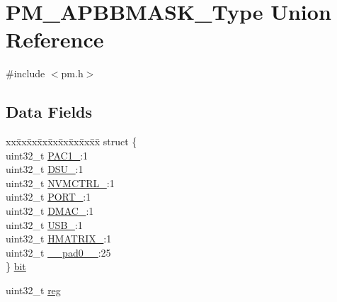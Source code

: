 \hypertarget{union_p_m___a_p_b_b_m_a_s_k___type}{}\section{P\+M\+\_\+\+A\+P\+B\+B\+M\+A\+S\+K\+\_\+\+Type Union Reference}
\label{union_p_m___a_p_b_b_m_a_s_k___type}


{\ttfamily \#include $<$pm.\+h$>$}

\subsection*{Data Fields}
\begin{DoxyCompactItemize}
\item 
\begin{tabbing}
xx\=xx\=xx\=xx\=xx\=xx\=xx\=xx\=xx\=\kill
struct \{\\
\>uint32\_t \mbox{\hyperlink{union_p_m___a_p_b_b_m_a_s_k___type_aa6054dab2ee60dc79fd6c2939cc2aed4}{PAC1\_}}:1\\
\>uint32\_t \mbox{\hyperlink{union_p_m___a_p_b_b_m_a_s_k___type_a724689d6c4fa35b29f257a0c6f3ceb80}{DSU\_}}:1\\
\>uint32\_t \mbox{\hyperlink{union_p_m___a_p_b_b_m_a_s_k___type_a6de823b7e07b83ea17b7629575f4173f}{NVMCTRL\_}}:1\\
\>uint32\_t \mbox{\hyperlink{union_p_m___a_p_b_b_m_a_s_k___type_ac43e1bcb4bcc76d98a8baa833e1d66b2}{PORT\_}}:1\\
\>uint32\_t \mbox{\hyperlink{union_p_m___a_p_b_b_m_a_s_k___type_a470993eafd2b62b3b45d6ac402d4bb40}{DMAC\_}}:1\\
\>uint32\_t \mbox{\hyperlink{union_p_m___a_p_b_b_m_a_s_k___type_ae77ce6f59c35c88ea05ef92a25090acc}{USB\_}}:1\\
\>uint32\_t \mbox{\hyperlink{union_p_m___a_p_b_b_m_a_s_k___type_a897c9b5262d62623583e88eeb0c8c005}{HMATRIX\_}}:1\\
\>uint32\_t \mbox{\hyperlink{union_p_m___a_p_b_b_m_a_s_k___type_a3e57c2ef1c3ffb36722f000cc1156824}{\_\_pad0\_\_}}:25\\
\} \mbox{\hyperlink{union_p_m___a_p_b_b_m_a_s_k___type_aa8267500f35e143bc79efb7a6b3f76f8}{bit}}\\

\end{tabbing}\item 
uint32\+\_\+t \mbox{\hyperlink{union_p_m___a_p_b_b_m_a_s_k___type_a6b91636401516a477989a336376d7b40}{reg}}
\end{DoxyCompactItemize}


